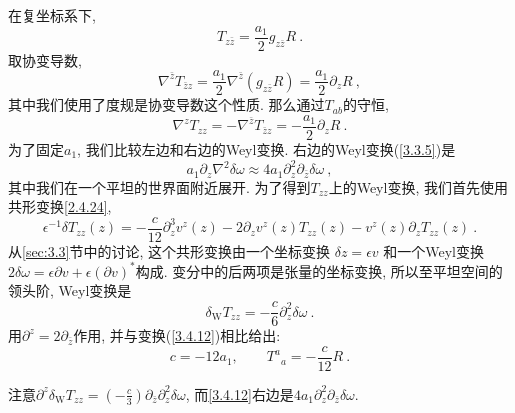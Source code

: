 在复坐标系下,
\begin{equation}
T_{z \bar{z}}=\frac{a_{1}}{2} g_{z \bar{z}} R \:. \label{3.4.9}
\end{equation}
取协变导数,
\begin{equation}
\nabla^{\bar{z}} T_{\bar{z} z}=\frac{a_{1}}{2} \nabla^{\bar{z}}(g_{z \bar{z}} R)=\frac{a_{1}}{2} \partial_{z} R \:, \label{3.4.10}
\end{equation}
其中我们使用了度规是协变导数这个性质. 那么通过$T_{ab}$的守恒,
\begin{equation}\label{3.4.11}
\nabla^{z} T_{z z}=-\nabla^{\bar{z}} T_{\bar{z} z}=-\frac{a_{1}}{2} \partial_{z} R \:.
\end{equation}
为了固定$a_1$, 我们比较左边和右边的Weyl变换. 右边的Weyl变换(\ref{3.3.5})是
\begin{equation}\label{3.4.12}
a_{1} \partial_{z} \nabla^{2} \delta \omega \approx 4 a_{1} \partial_{z}^{2} \partial_{\bar{z}} \delta \omega \:,
\end{equation}
其中我们在一个平坦的世界面附近展开. 为了得到$T_{zz}$上的Weyl变换, 我们首先使用共形变换\eqref{2.4.24},
\begin{equation}
\epsilon^{-1} \delta T_{z z}(z)=-\frac{c}{12} \partial_{z}^{3} v^{z}(z)-2 \partial_{z} v^{z}(z) T_{z z}(z)-v^{z}(z) \partial_{z} T_{z z}(z) \:. \label{3.4.13}
\end{equation}
从\ref{sec:3.3}节中的讨论, 这个共形变换由一个坐标变换 $\delta z=\epsilon v$ 和一个Weyl变换 $2 \delta \omega=\epsilon \partial v+\epsilon(\partial v)^{*}$构成. 变分中的后两项是张量的坐标变换, 所以至平坦空间的领头阶, Weyl变换是
\begin{equation}
\delta_{\mathrm{W}} T_{z z}=-\frac{c}{6} \partial_{z}^{2} \delta \omega \:. \label{3.4.14}
\end{equation}
用$\partial^{z}=2 \partial_{\bar{z}}$作用, 并与变换(\ref{3.4.12})相比给出: 
\begin{equation}
c=-12 a_{1}, \qquad {T^a}_{a}=-\frac{c}{12} R \:. \label{3.4.15}
\end{equation}
\begin{tcolorbox}
	注意$\partial^{z} \delta_{\mathrm{W}} T_{z z}=\left(-\frac{c}{3}\right) \partial_{\bar{z}} \partial_{z}^{2} \delta \omega$, 而\eqref{3.4.12}右边是$4 a_{1} \partial_{z}^{2} \partial_{\bar{z}} \delta \omega$.
\end{tcolorbox}

